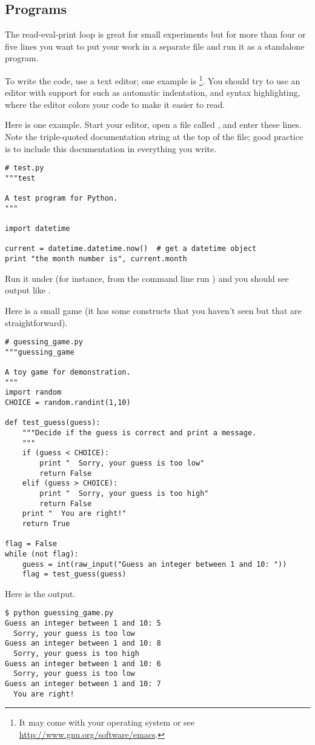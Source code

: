 \subsection{Programs}
The read-eval-print loop is great for small experiments but
for more than four or five lines you 
want to put your work in a separate file and run it as a standalone program.

To write the code, use a text editor; one example is 
\footnote{It may come with your operating system or 
see \protect\url{http://www.gnu.org/software/emacs}.}.
You should try to use an editor with support for \python{} such as
automatic indentation, and  
syntax highlighting, where the editor colors your code to make it easier to
read.

Here is one example.
Start your editor, open a file called , and enter these lines.
Note the triple-quoted documentation string at the top of the file; 
good practice is to include this documentation in everything you write.
\begin{lstlisting}[style=python]
# test.py
"""test

A test program for Python. 
"""

import datetime
 
current = datetime.datetime.now()  # get a datetime object
print "the month number is", current.month
\end{lstlisting}
Run it under \python{} (for instance, from the command line
run ) and you should see
output like .

Here is a small game (it has some \python{} constructs that
you haven't seen but that are straightforward).
\begin{lstlisting}[style=python]
# guessing_game.py
"""guessing_game

A toy game for demonstration.
"""
import random
CHOICE = random.randint(1,10)

def test_guess(guess):
    """Decide if the guess is correct and print a message.
    """
    if (guess < CHOICE):
        print "  Sorry, your guess is too low"
        return False
    elif (guess > CHOICE):
        print "  Sorry, your guess is too high"
        return False
    print "  You are right!"
    return True

flag = False
while (not flag):
    guess = int(raw_input("Guess an integer between 1 and 10: "))
    flag = test_guess(guess)
\end{lstlisting}
Here is the output.
\begin{lstlisting}
$ python guessing_game.py
Guess an integer between 1 and 10: 5
  Sorry, your guess is too low
Guess an integer between 1 and 10: 8
  Sorry, your guess is too high
Guess an integer between 1 and 10: 6
  Sorry, your guess is too low
Guess an integer between 1 and 10: 7
  You are right!
\end{lstlisting}  %

